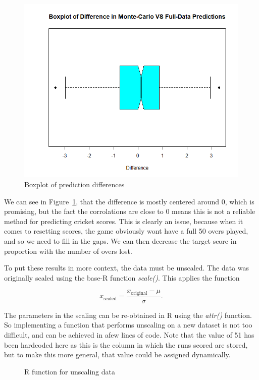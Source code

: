 \begin{figure}[h]
    \centering
    \includegraphics[scale=0.6]{figures/diffbox.png}
    \caption{Boxplot of prediction differences}
    \label{diffbox}
\end{figure}

We can see in Figure~\ref{diffbox}, that the difference is mostly centered around 0, which is promising, but the fact the corrolations are close to 0 means this is not a reliable method for predicting 
cricket scores. This is clearly an issue, because when it comes to resetting scores, the game obviously wont have a full 50 overs played, and so we need to fill in the gaps. We can then decrease the target score in proportion 
with the number of overs lost.

To put these results in more context, the data must be unscaled. The data was originally scaled using the base-R function \textit{scale()}. This applies the function

\[
    x_{\text{scaled}} = \frac{x_{\text{original}}-\mu}{\sigma}.    
\]

The parameters in the scaling can be re-obtained in R using the \textit{attr()} function. So implementing a function that 
performs unscaling on a new dataset is not too difficult, and can be achieved in afew lines of code. Note that the value of 51 has been hardcoded 
here as this is the column in which the runs scored are stored, but to make this more general, that value could be assigned dynamically.

\begin{figure}[h]
    
    \caption{R function for unscaling data}
    \label{unscale}
\end{figure}

